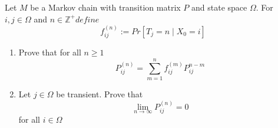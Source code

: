 \documentclass[a4paper, 11pt, oneside]{article}
\newenvironment{problem}[1]
  {\renewcommand\theinnercustomprob{#1}\innercustomprob}
  {\endinnercustomprob}
\newcommand{\Z}{\mathbb{Z}}
\begin{document}
 \begin{problem}{10}\label{problem10}
 Let $M$ be a Markov chain with transition matrix $P$ and state space $\Omega$.
 For $i,j \in \Omega$ and $n \in \Z^{+} define$
 \begin{equation*} 
f^{(n)}_{ij} := Pr[T_j=n\mid X_0=i]
\end{equation*} 
 \begin{enumerate}
 \item Prove that for all $n \geq 1$
  \begin{equation*} 
P^{(n)}_{ij} = \sum_{m=1}^n f_{ij}^{(m)}P_{ij}^{n-m}
\end{equation*} 

 \item Let $j \in \Omega$ be transient. Prove that
  \begin{equation*} 
\lim_{n\to\infty} P_{ij}^{(n)} = 0
\end{equation*} 
for all $i \in \Omega$
  \end{enumerate}

\end{problem}
\end{document}
